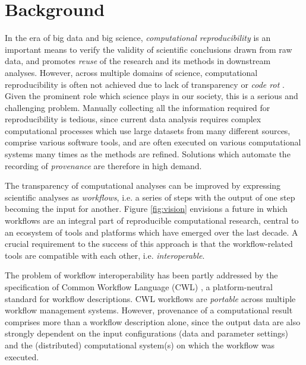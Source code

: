 \section{Background}
In the era of big data and big science, \emph{computational reproducibility} is an important means to verify the validity of scientific conclusions drawn from raw data, and promotes \emph{reuse} of the research and its methods in downstream analyses. However, across multiple domains of science, computational reproducibility is often not achieved due to lack of transparency or \emph{code rot} \cite{committeeonreproducibilityandreplicabilityinscienceReproducibilityReplicabilityScience2019}. Given the prominent role which science plays in our society, this is a serious and challenging problem. Manually collecting all the information required for reproducibility is tedious, %
since current data analysis requires complex computational processes which use large datasets from many different sources, comprise various software tools, and are often executed on various computational systems many times as the methods are refined. Solutions which automate the recording of \emph{provenance} are therefore in high demand.

The transparency of computational analyses can be improved by expressing scientific analyses as \emph{workflows}, i.e. a series of steps with the output of one step becoming the input for another. Figure \ref{fig:vision} envisions a future in which workflows are an integral part of reproducible computational research, central to an ecosystem of tools and platforms which have emerged over the last decade. 
A crucial requirement to the success of this approach is that the workflow-related tools are compatible with each other, i.e. \emph{interoperable}. 

The problem of workflow interoperability has been partly addressed by the specification of Common Workflow Language (CWL) \citep{crusoeMethodsIncludedStandardizing2022}, a platform-neutral standard for workflow descriptions. CWL workflows are \emph{portable} across multiple workflow management systems. However, provenance of a computational result comprises more than a workflow description alone,
since the output data are also strongly dependent on the input configurations (data and parameter settings) and the (distributed) computational system(s) on which the workflow was executed. 


